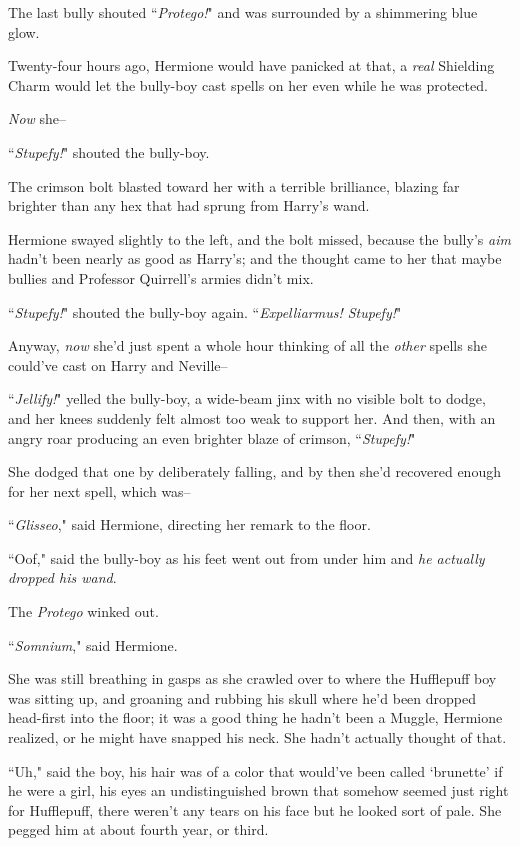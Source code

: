 The last bully shouted ``\emph{Protego!}" and was surrounded by a shimmering blue glow.

Twenty-four hours ago, Hermione would have panicked at that, a \emph{real} Shielding Charm would let the bully-boy cast spells on her even while he was protected.

\emph{Now} she\---

``\emph{Stupefy!}" shouted the bully-boy.

The crimson bolt blasted toward her with a terrible brilliance, blazing far brighter than any hex that had sprung from Harry's wand.

Hermione swayed slightly to the left, and the bolt missed, because the bully's \emph{aim} hadn't been nearly as good as Harry's; and the thought came to her that maybe bullies and Professor Quirrell's armies didn't mix.

``\emph{Stupefy!}" shouted the bully-boy again. ``\emph{Expelliarmus! Stupefy!}"

Anyway, \emph{now} she'd just spent a whole hour thinking of all the \emph{other} spells she could've cast on Harry and Neville\---

``\emph{Jellify!}" yelled the bully-boy, a wide-beam jinx with no visible bolt to dodge, and her knees suddenly felt almost too weak to support her. And then, with an angry roar producing an even brighter blaze of crimson, ``\emph{Stupefy!}"

She dodged that one by deliberately falling, and by then she'd recovered enough for her next spell, which was\---

``\emph{Glisseo}," said Hermione, directing her remark to the floor.

``Oof," said the bully-boy as his feet went out from under him and \emph{he actually dropped his wand}.

The \emph{Protego} winked out.

``\emph{Somnium}," said Hermione.

She was still breathing in gasps as she crawled over to where the Hufflepuff boy was sitting up, and groaning and rubbing his skull where he'd been dropped head-first into the floor; it was a good thing he hadn't been a Muggle, Hermione realized, or he might have snapped his neck. She hadn't actually thought of that.

``Uh," said the boy, his hair was of a color that would've been called `brunette' if he were a girl, his eyes an undistinguished brown that somehow seemed just right for Hufflepuff, there weren't any tears on his face but he looked sort of pale. She pegged him at about fourth year, or third.


